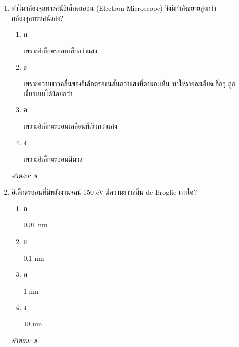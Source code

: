 \documentclass[12pt]{article}
\begin{document}
\begin{enumerate}[label=\arabic*., itemsep=0.5\baselineskip, topsep=0.5\baselineskip, leftmargin=*]
\item ทำไมกล้องจุลทรรศน์อิเล็กตรออน (Electron Microscope) จึงมีกำลังขยายสูงกว่ากล้องจุลทรรศน์แสง?
\begin{enumerate}[label=\alph*)., itemsep=0.3\baselineskip, topsep=0.3\baselineskip]
\item ก\ 
\begin{minipage}[t]{0.9\linewidth}
\raggedright เพราะอิเล็กตรออนเล็กกว่าแสง
\end{minipage}
\item ข\ 
\begin{minipage}[t]{0.9\linewidth}
\raggedright เพราะความยาวคลื่นของอิเล็กตรออนสั้นกว่าแสงที่ตามองเห็น ทำให้รายละเอียดเล็กๆ ถูกเลี้ยวเบนได้น้อยกว่า
\end{minipage}
\item ค\ 
\begin{minipage}[t]{0.9\linewidth}
\raggedright เพราะอิเล็กตรออนเคลื่อนที่เร็วกว่าแสง
\end{minipage}
\item ง\ 
\begin{minipage}[t]{0.9\linewidth}
\raggedright เพราะอิเล็กตรออนมีมวล
\end{minipage}
\end{enumerate}
\vspace{-0.3\baselineskip}
\begin{small}
\textit{คำตอบ: ข}
\end{small}

\item อิเล็กตรออนที่มีพลังงานจลน์ 150 eV มีความยาวคลื่น de Broglie เท่าใด?
\begin{enumerate}[label=\alph*)., itemsep=0.3\baselineskip, topsep=0.3\baselineskip]
\item ก\ 
\begin{minipage}[t]{0.9\linewidth}
\raggedright 0.01 nm
\end{minipage}
\item ข\ 
\begin{minipage}[t]{0.9\linewidth}
\raggedright 0.1 nm
\end{minipage}
\item ค\ 
\begin{minipage}[t]{0.9\linewidth}
\raggedright 1 nm
\end{minipage}
\item ง\ 
\begin{minipage}[t]{0.9\linewidth}
\raggedright 10 nm
\end{minipage}
\end{enumerate}
\vspace{-0.3\baselineskip}
\begin{small}
\textit{คำตอบ: ข}
\end{small}


\end{enumerate}
\end{document}
